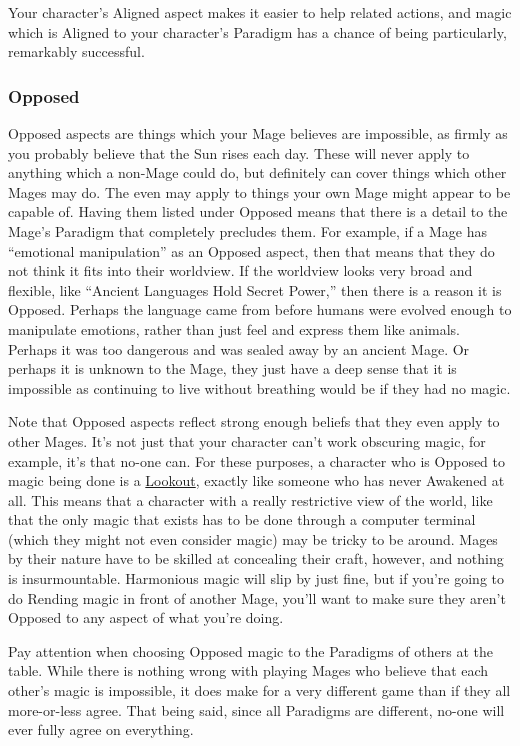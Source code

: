 \documentclass[
]{article}
\begin{document}
Your character's Aligned aspect makes it easier to help related actions,
and magic which is Aligned to your character's Paradigm has a chance of
being particularly, remarkably successful.

\hypertarget{opposed}{%
\subsubsection{Opposed}\label{opposed}}

Opposed aspects are things which your Mage believes are impossible, as
firmly as you probably believe that the Sun rises each day. These will
never apply to anything which a non-Mage could do, but definitely can
cover things which other Mages may do. The even may apply to things your
own Mage might appear to be capable of. Having them listed under Opposed
means that there is a detail to the Mage's Paradigm that completely
precludes them. For example, if a Mage has ``emotional manipulation'' as
an Opposed aspect, then that means that they do not think it fits into
their worldview. If the worldview looks very broad and flexible, like
``Ancient Languages Hold Secret Power,'' then there is a reason it is
Opposed. Perhaps the language came from before humans were evolved
enough to manipulate emotions, rather than just feel and express them
like animals. Perhaps it was too dangerous and was sealed away by an
ancient Mage. Or perhaps it is unknown to the Mage, they just have a
deep sense that it is impossible as continuing to live without breathing
would be if they had no magic.

Note that Opposed aspects reflect strong enough beliefs that they even
apply to other Mages. It's not just that your character can't work
obscuring magic, for example, it's that no-one can. For these purposes,
a character who is Opposed to magic being done is a
\href{Lookouts}{Lookout}, exactly like someone who has never Awakened at
all. This means that a character with a really restrictive view of the
world, like that the only magic that exists has to be done through a
computer terminal (which they might not even consider magic) may be
tricky to be around. Mages by their nature have to be skilled at
concealing their craft, however, and nothing is insurmountable.
Harmonious magic will slip by just fine, but if you're going to do
Rending magic in front of another Mage, you'll want to make sure they
aren't Opposed to any aspect of what you're doing.

Pay attention when choosing Opposed magic to the Paradigms of others at
the table. While there is nothing wrong with playing Mages who believe
that each other's magic is impossible, it does make for a very different
game than if they all more-or-less agree. That being said, since all
Paradigms are different, no-one will ever fully agree on everything.
\end{document}
